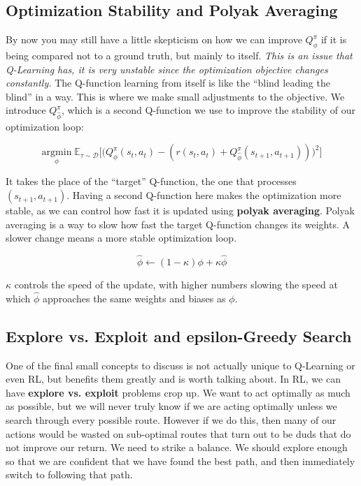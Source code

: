 \subsection{Optimization Stability and Polyak Averaging}
    \large By now you may still have a little skepticism on how we can improve $Q^\pi_\phi$ if it is being compared not to a ground truth, but mainly to itself. \textit{This is an issue that Q-Learning has, it is very unstable since the optimization objective changes constantly.} The Q-function learning from itself is like the ``blind leading the blind'' in a way. This is where we make small adjustments to the objective. We introduce $Q^\pi_{\hat{\phi}}$, which is a second Q-function we use to improve the stability of our optimization loop:

    $$\underset{\phi}{\mathrm{argmin}}\;\mathbb{E}_{\tau \sim \mathcal{D}}\biggl[\biggl(Q_\phi^\pi(s_t, a_t) - (r(s_t, a_t) + Q_{\hat{\phi}}^\pi(s_{t+1}, a_{t+1}))\biggr)^2\biggr]$$

    It takes the place of the ``target'' Q-function, the one that processes $(s_{t+1}, a_{t+1})$. Having a second Q-function here makes the optimization more stable, as we can control how fast it is updated using \textbf{polyak averaging}. Polyak averaging is a way to slow how fast the target Q-function changes its weights. A slower change means a more stable optimization loop.

    $$\hat{\phi} \leftarrow (1-\kappa)\phi + \kappa\hat{\phi}$$

    $\kappa$ controls the speed of the update, with higher numbers slowing the speed at which $\hat{\phi}$ approaches the same weights and biases as $\phi$.
\subsection{Explore vs. Exploit and epsilon-Greedy Search}
    \large One of the final small concepts to discuss is not actually unique to Q-Learning or even RL, but benefits them greatly and is worth talking about. In RL, we can have \textbf{explore vs. exploit} problems crop up. We want to act optimally as much as possible, but we will never truly know if we are acting optimally unless we search through every possible route. However if we do this, then many of our actions would be wasted on sub-optimal routes that turn out to be duds that do not improve our return. We need to strike a balance. We should explore enough so that we are confident that we have found the best path, and then immediately switch to following that path. 

